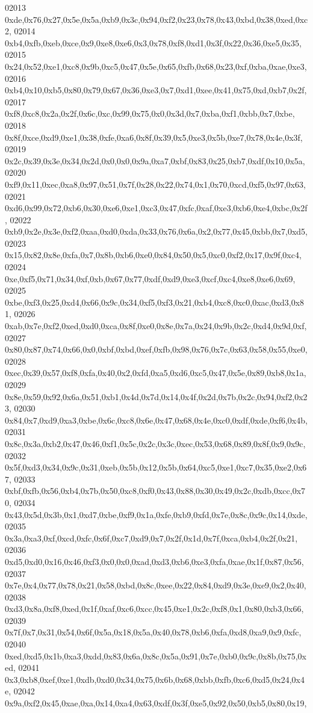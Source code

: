 \begin{DoxyCode}
02013   0xde,0x76,0x27,0x5e,0x5a,0xb9,0x3c,0x94,0xf2,0x23,0x78,0x43,0xbd,0x38,0xed,0xc2,
02014   0xb4,0xfb,0xeb,0xce,0x9,0xe8,0xe6,0x3,0x78,0xf8,0xd1,0x3f,0x22,0x36,0xe5,0x35,
02015   0x24,0x52,0xe1,0xc8,0x9b,0xc5,0x47,0x5e,0x65,0xfb,0x68,0x23,0xf,0xba,0xae,0xe3,
02016   0xb4,0x10,0xb5,0x80,0x79,0x67,0x36,0xe3,0x7,0xd1,0xee,0x41,0x75,0xd,0xb7,0x2f,
02017   0xf8,0xc8,0x2a,0x2f,0x6c,0xc,0x99,0x75,0x0,0x3d,0x7,0xba,0xf1,0xbb,0x7,0xbe,
02018   0x8f,0xce,0xd9,0xe1,0x38,0xfe,0xa6,0x8f,0x39,0x5,0xe3,0x5b,0xe7,0x78,0x4e,0x3f,
02019   0x2c,0x39,0x3e,0x34,0x2d,0x0,0x0,0x9a,0xa7,0xbf,0x83,0x25,0xb7,0xdf,0x10,0x5a,
02020   0xf9,0x11,0xec,0xa8,0x97,0x51,0x7f,0x28,0x22,0x74,0x1,0x70,0xcd,0xf5,0x97,0x63,
02021   0xd6,0x99,0x72,0xb6,0x30,0xe6,0xe1,0xc3,0x47,0xfc,0xaf,0xe3,0xb6,0xe4,0xbc,0x2f,
02022   0xb9,0x2e,0x3e,0xf2,0xaa,0xd0,0xda,0x33,0x76,0x6a,0x2,0x77,0x45,0xbb,0x7,0xd5,
02023   0x15,0x82,0x8e,0xfa,0x7,0x8b,0xb6,0xe0,0x84,0x50,0x5,0xc0,0xf2,0x17,0x9f,0xc4,
02024   0xe,0xf5,0x71,0x34,0xf,0xb,0x67,0x77,0xdf,0xd9,0xe3,0xcf,0xc4,0xe8,0xe6,0x69,
02025   0xbe,0xf3,0x25,0xd4,0x66,0x9c,0x34,0xf5,0xf3,0x21,0xb4,0xc8,0xc0,0xac,0xd3,0x81,
02026   0xab,0x7e,0xf2,0xed,0xd0,0xca,0x8f,0xe0,0x8e,0x7a,0x24,0x9b,0x2c,0xd4,0x9d,0xf,
02027   0x80,0x87,0x74,0x66,0x0,0xbf,0xbd,0xef,0xfb,0x98,0x76,0x7c,0x63,0x58,0x55,0xe0,
02028   0xec,0x39,0x57,0xf8,0xfa,0x40,0x2,0xfd,0xa5,0xd6,0xc5,0x47,0x5e,0x89,0xb8,0x1a,
02029   0x8e,0x59,0x92,0x6a,0x51,0xb1,0x4d,0x7d,0x14,0x4f,0x2d,0x7b,0x2c,0x94,0xf2,0x23,
02030   0x84,0x7,0xd9,0xa3,0xbe,0x6c,0xc8,0x6e,0x47,0x68,0x4e,0xc0,0xdf,0xde,0xf6,0x4b,
02031   0x8c,0x3a,0xb2,0x47,0x46,0xf1,0x5c,0x2c,0x3c,0xec,0x53,0x68,0x89,0x8f,0x9,0x9c,
02032   0x5f,0xd3,0x34,0x9c,0x31,0xeb,0x5b,0x12,0x5b,0x64,0xc5,0xe1,0xc7,0x35,0xe2,0x67,
02033   0xbf,0xfb,0x56,0xb4,0x7b,0x50,0xc8,0xf0,0x43,0x88,0x30,0x49,0x2c,0xdb,0xcc,0x70,
02034   0x43,0x5d,0x3b,0x1,0xd7,0xbe,0xf9,0x1a,0xfe,0xb9,0xfd,0x7e,0x8c,0x9c,0x14,0xde,
02035   0x3a,0xa3,0xf,0xcd,0xfc,0x6f,0xc7,0xd9,0x7,0x2f,0x1d,0x7f,0xca,0xb4,0x2f,0x21,
02036   0xd5,0xd0,0x16,0x46,0xf3,0x0,0x0,0xad,0xd3,0xb6,0xe3,0xfa,0xae,0x1f,0x87,0x56,
02037   0x7e,0x4,0x77,0x78,0x21,0x58,0xbd,0x8c,0xee,0x22,0x84,0xd9,0x3e,0xe9,0x2,0x40,
02038   0xd3,0x8a,0xf8,0xed,0x1f,0xaf,0xc6,0xcc,0x45,0xe1,0x2c,0xf8,0x1,0x80,0xb3,0x66,
02039   0x7f,0x7,0x31,0x54,0x6f,0x5a,0x18,0x5a,0x40,0x78,0xb6,0xfa,0xd8,0xa9,0x9,0xfc,
02040   0xed,0xd5,0x1b,0xa3,0xdd,0x83,0x6a,0x8c,0x5a,0x91,0x7e,0xb0,0x9c,0x8b,0x75,0xed,
02041   0x3,0xb8,0xef,0xe1,0xdb,0xd0,0x34,0x75,0x6b,0x68,0xbb,0xfb,0xc6,0xd5,0x24,0x4e,
02042   0x9a,0xf2,0x45,0xae,0xa,0x14,0xa4,0x63,0xdf,0x3f,0xe5,0x92,0x50,0xb5,0x80,0x19,

\end{DoxyCode}
